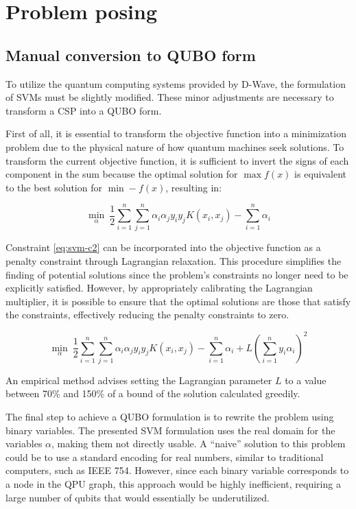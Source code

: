 \chapter{Problem posing}

\section{Manual conversion to QUBO form}

To utilize the quantum computing systems provided by D-Wave, the formulation of SVMs must be slightly modified. These minor adjustments are necessary to transform a CSP into a QUBO form.

First of all, it is essential to transform the objective function into a minimization problem due to the physical nature of how quantum machines seek solutions. To transform the current objective function, it is sufficient to invert the signs of each component in the sum because the optimal solution for $\max f(x)$ is equivalent to the best solution for $\min -f(x)$, resulting in:

\begin{equation}\label{eq:min-svm}
    \min_\alpha\ \frac{1}{2}\sum_{i=1}^n\sum_{j=1}^n\alpha_i\alpha_jy_iy_jK(x_i, x_j) - \sum_{i=1}^n\alpha_i
\end{equation}

Constraint \ref{eq:svm-c2} can be incorporated into the objective function as a penalty constraint through Lagrangian relaxation. This procedure simplifies the finding of potential solutions since the problem’s constraints no longer need to be explicitly satisfied. However, by appropriately calibrating the Lagrangian multiplier, it is possible to ensure that the optimal solutions are those that satisfy the constraints, effectively reducing the penalty constraints to zero.

$$\min_\alpha\ \frac{1}{2}\sum_{i=1}^n\sum_{j=1}^n\alpha_i\alpha_jy_iy_jK(x_i, x_j) - \sum_{i=1}^n\alpha_i + L\left(\sum_{i=1}^ny_i\alpha_i\right)^2$$

An empirical method advises setting the Lagrangian parameter $L$ to a value between 70\% and 150\% of a bound of the solution calculated greedily\cite{QbridgeI}.

The final step to achieve a QUBO formulation is to rewrite the problem using binary variables. The presented SVM formulation uses the real domain for the variables $\alpha$, making them not directly usable. A ``naive'' solution to this problem could be to use a standard encoding for real numbers, similar to traditional computers, such as IEEE 754\cite{IEEE}. However, since each binary variable corresponds to a node in the QPU graph, this approach would be highly inefficient, requiring a large number of qubits that would essentially be underutilized.

